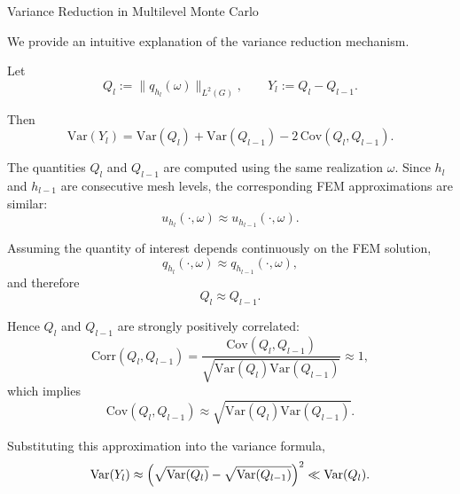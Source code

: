 \documentclass[
  english,            %
  aspectratio=169,    %
]{tumbeamer}
\begin{document}
\begin{frame}{Variance Reduction in Multilevel Monte Carlo}

We provide an intuitive explanation of the variance reduction mechanism. 

\medskip

Let
\[
Q_l := \|q_{h_l}(\omega)\|_{L^2(G)},
\qquad
Y_l := Q_l - Q_{l-1}.
\]

Then
\[
\mathrm{Var}(Y_l)
=
\mathrm{Var}(Q_l)
+
\mathrm{Var}(Q_{l-1})
-
2\,\mathrm{Cov}(Q_l,Q_{l-1}).
\]

\bigskip

The quantities $Q_l$ and $Q_{l-1}$ are computed using the same realization
$\omega$. Since $h_l$ and $h_{l-1}$ are consecutive mesh levels, the
corresponding FEM approximations are similar:
\[
u_{h_l}(\cdot,\omega)
\approx
u_{h_{l-1}}(\cdot,\omega).
\]

Assuming the quantity of interest depends continuously on the FEM solution,
\[
q_{h_l}(\cdot,\omega)
\approx
q_{h_{l-1}}(\cdot,\omega),
\]
and therefore
\[
Q_l \approx Q_{l-1}.
\]

\end{frame}


\begin{frame}{}
\bigskip

\bigskip

Hence $Q_l$ and $Q_{l-1}$ are strongly positively correlated:
\[
\mathrm{Corr}(Q_l,Q_{l-1})
=
\frac{\mathrm{Cov}(Q_l,Q_{l-1})}
{\sqrt{\mathrm{Var}(Q_l)\mathrm{Var}(Q_{l-1})}}
\approx 1,
\]
which implies
\[
\mathrm{Cov}(Q_l,Q_{l-1})
\approx
\sqrt{\mathrm{Var}(Q_l)\mathrm{Var}(Q_{l-1})}.
\]

Substituting this approximation into the variance formula,
\[
\mathrm{Var}(Y_l)
\approx
\Bigl(
\sqrt{\mathrm{Var}(Q_l)}
-
\sqrt{\mathrm{Var}(Q_{l-1})}
\Bigr)^2
\ll
\mathrm{Var}(Q_l).
\]


\end{frame}

\end{document}

